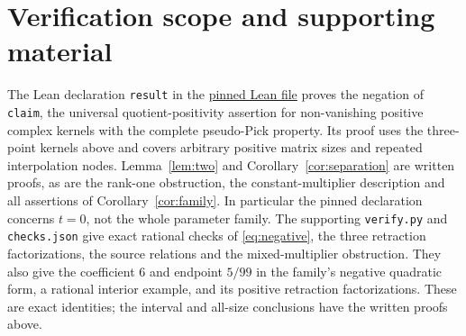 \documentclass[11pt]{article}
\begin{document}
\section{Verification scope and supporting material}
The Lean declaration \texttt{result} in the
\href{https://github.com/the-omega-institute/trureturing/blob/8acf7efa41af7fc9ddbbd39571e7ef73462f4509/D5/S3/HilbertOperators/ReproducingKernels/CompletePseudoPickQuotientRefutation.lean}{pinned Lean file}
proves the negation of \texttt{claim}, the universal quotient-positivity
assertion for non-vanishing positive complex kernels with the complete
pseudo-Pick property. Its proof uses the three-point kernels above and
covers arbitrary positive matrix sizes and repeated interpolation
nodes. Lemma~\ref{lem:two} and Corollary~\ref{cor:separation} are written
proofs, as are the rank-one obstruction, the constant-multiplier
description and all assertions of Corollary~\ref{cor:family}.
In particular the pinned declaration concerns $t=0$, not the whole
parameter family. The supporting \texttt{verify.py} and \texttt{checks.json}
give exact rational checks of \eqref{eq:negative}, the three retraction
factorizations, the source relations and the mixed-multiplier obstruction.
They also give the coefficient $6$ and endpoint $5/99$ in the family's
negative quadratic form, a rational interior example, and its positive
retraction factorizations. These are exact identities; the interval and
all-size conclusions have the written proofs above.
\end{document}
